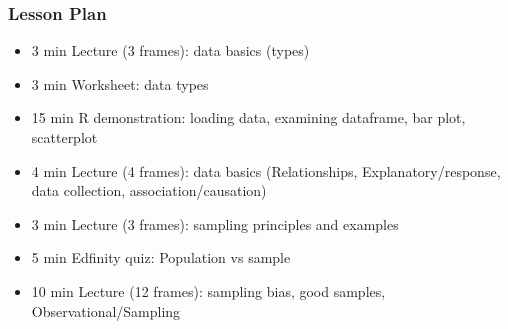 \begin{frame}
    \frametitle{Lesson Plan}
    \begin{itemize}
        \item 3 min Lecture (3 frames): data basics (types)
        \item 3 min Worksheet: data types
        \item 15 min R demonstration: loading data, examining dataframe, bar plot, scatterplot
        \item 4 min Lecture (4 frames): data basics (Relationships, Explanatory/response, data collection, association/causation)
        \item 3 min Lecture (3 frames): sampling principles and examples
        \item 5 min Edfinity quiz: Population vs sample
        \item 10 min Lecture (12 frames): sampling bias, good samples, Observational/Sampling
    \end{itemize}
\end{frame}
    
